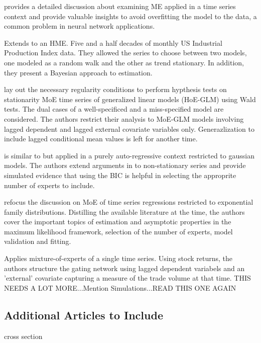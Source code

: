 \documentclass[12pt]{article}
\begin{document}
\cite{WMS1995} provides a detailed discussion about examining ME applied in
a time series context and provide valuable insights to avoid overfitting the
model to the data, a common problem in neural network applications.

\cite{HuertaJiangTanner2003} Extends \cite{WMS1995} to an HME.
Five and a half decades of monthly US Industrial Production
Index data. They allowed the series to choose between two models, one modeled
as a random walk and the other as trend stationary. In addition, they present a
Bayesian approach to estimation.

\cite{CarvalhoTanner2003} lay out the necessary regularity conditions to perform
hypthesis tests on stationarity MoE time series of generalized linear models (HoE-GLM)
using Wald tests. The dual cases of a well-specificed and a miss-specified model
are considered. The authors restrict their analysis to MoE-GLM models involving
lagged dependent and lagged external covariate variables only. Generazlization to
include lagged conditional mean values is left for another time.

\cite{CarvalhoTanner2005} is similar to \cite{CarvalhoTanner2003} but applied
in a purely auto-regressive context restricted to gaussian models. The authors
extend arguments in \cite{CarvalhoTanner2003} to non-stationary series and
provide simulated evidence that using the BIC is helpful in selecting the 
approprite number of experts to include.

\cite{CarvalhoTanner2006} refocus the discussion on MoE of time series
regressions restricted to exponential family distributions. Distilling
the available literature at the time, the authors cover the important
topics of estimation and asymptotic properties in the maximum likelihood
framework, selection of the number of experts, model validation and
fitting.

\cite{CarvalhoSkoulakis2010} Applies mixture-of-experts of a single time series.
Using stock returns, the authors structure the gating network using lagged
dependent variabels and an 'external' covariate capturing a measure of the
trade volume at that time. THIS NEEDS A LOT MORE...Mention Simulations...READ 
THIS ONE AGAIN




\subsection{Additional Articles to Include}


\cite{JeffriesPfeiffer2001} cross section
\end{document}
